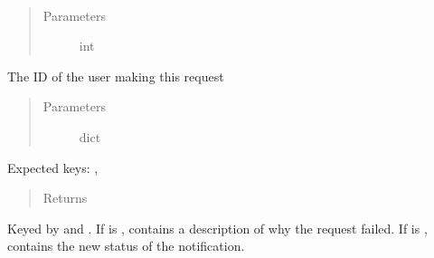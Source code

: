 \documentclass[letterpaper,10pt,english]{sphinxmanual}
\begin{document}
\begin{fulllineitems}
\label{\detokenize{tiger_leagues/models/readme:tiger_leagues.models.user_model.update_notification_status}}~\begin{quote}\begin{description}
\item[{Parameters}] \leavevmode
{} \textendash{} int

\end{description}\end{quote}

The ID of the user making this request
\begin{quote}\begin{description}
\item[{Parameters}] \leavevmode
{} \textendash{} dict

\end{description}\end{quote}

Expected keys: , 
\begin{quote}\begin{description}
\item[{Returns}] \leavevmode
{}

\end{description}\end{quote}

Keyed by  and . 
If  is ,  contains a description of why the 
request failed.
If  is ,  contains the new status of the 
notification.

\end{fulllineitems}

\end{document}
